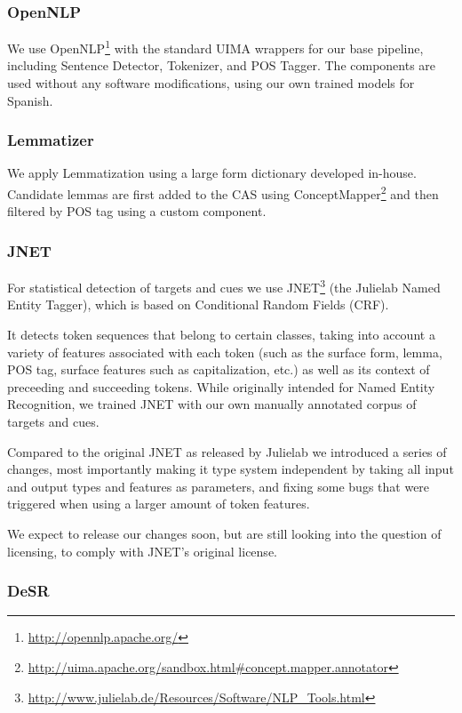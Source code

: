 \documentclass{llncs}
\begin{document}
\subsubsection{OpenNLP}

We use OpenNLP\footnote{\url{http://opennlp.apache.org/}} with the standard UIMA wrappers for our base pipeline, including Sentence Detector, Tokenizer, and POS Tagger. The components are used without any software modifications, using our own trained models for Spanish.

\subsubsection{Lemmatizer}

We apply Lemmatization using a large form dictionary developed in-house. Candidate lemmas are first added to the CAS using ConceptMapper\footnote{\url{http://uima.apache.org/sandbox.html\#concept.mapper.annotator}} and then filtered by POS tag using a custom component.

\subsubsection{JNET}

For statistical detection of targets and cues we use JNET\footnote{\url{http://www.julielab.de/Resources/Software/NLP\_Tools.html}} (the Julielab Named Entity Tagger), which is based on Conditional Random Fields (CRF).

It detects token sequences that belong to certain classes, taking into account  a variety of features associated with each token (such as the surface form, lemma, POS tag, surface features such as capitalization, etc.) as well as its context of preceeding and succeeding tokens. While originally intended for Named Entity Recognition, we trained JNET with our own manually annotated corpus of targets and cues.

Compared to the original JNET as released by Julielab we introduced a series of changes, most importantly making it type system independent by taking all input and output types and features as parameters, and fixing some bugs that were triggered when using a larger amount of token features.

We expect to release our changes soon, but are still looking into the question of licensing, to comply with JNET's original license.

\subsubsection{DeSR}
\end{document}
